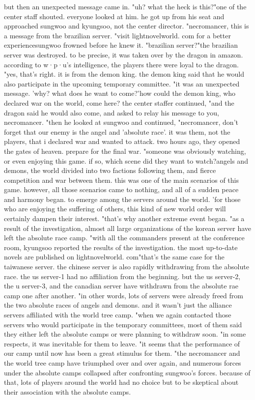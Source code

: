 but then an unexpected message came in.
"uh? what the heck is this?"one of the center staff shouted.
 everyone looked at him.
 he got up from his seat and approached sungwoo and kyungsoo, not the center director.
"necromancer, this is a message from the brazilian server.
"visit lightnovelworld.
com for a better experiencesungwoo frowned before he knew it.
"brazilian server?"the brazilian server was destroyed.
 to be precise, it was taken over by the dragon in amazon.
according to w·p·u's intelligence, the players there were loyal to the dragon.
"yes, that's right.
 it is from the demon king.
 the demon king said that he would also participate in the upcoming temporary committee.
"it was an unexpected message.
 'why? what does he want to come?'how could the demon king, who declared war on the world, come here? the center staffer continued, "and the dragon said he would also come, and asked to relay his message to you, necromancer.
"then he looked at sungwoo and continued, "necromancer, don't forget that our enemy is the angel and 'absolute race'.
 it was them, not the players, that i declared war and wanted to attack.
 two hours ago, they opened the gates of heaven.
 prepare for the final war.
"someone was obviously watching, or even enjoying this game.
 if so, which scene did they want to watch?angels and demons, the world divided into two factions following them, and fierce competition and war between them.
 this was one of the main scenarios of this game.
however, all those scenarios came to nothing, and all of a sudden peace and harmony began.
to emerge among the servers around the world.
 'for those who are enjoying the suffering of others, this kind of new world order will certainly dampen their interest.
"that's why another extreme event began.
"as a result of the investigation, almost all large organizations of the korean server have left the absolute race camp.
"with all the commanders present at the conference room, kyungsoo reported the results of the investigation.
the most up-to-date novels are published on lightnov‌elworld.
com"that's the same case for the taiwanese server.
 the chinese server is also rapidly withdrawing from the absolute race.
 the us server-1 had no affiliation from the beginning.
 but the us server-2, the u server-3, and the canadian server have withdrawn from the absolute rae camp one after another.
"in other words, lots of servers were already freed from the two absolute races of angels and demons.
 and it wasn't just the alliance servers affiliated with the world tree camp.
"when we again contacted those servers who would participate in the temporary committees, most of them said they either left the absolute camps or were planning to withdraw soon.
"in some respects, it was inevitable for them to leave.
"it seems that the performance of our camp until now has been a great stimulus for them.
"the necromancer and the world tree camp have triumphed over and over again, and numerous forces under the absolute camps collapsed after confronting sungwoo's forces.
 because of that, lots of players around the world had no choice but to be skeptical about their association with the absolute camps.
 

